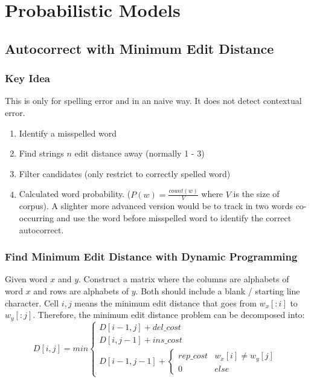 \chapter{Probabilistic Models}

\section{Autocorrect with Minimum Edit Distance}

\subsection{Key Idea} 
This is only for spelling error and in an naive way. It does not detect contextual error. 
\begin{enumerate}
    \item Identify a misspelled word 
    \item Find strings $n$ edit distance away (normally 1 - 3)
    \item Filter candidates (only restrict to correctly spelled word)
    \item Calculated word probability. ($P(w) = \frac{count(w)}{V}$ where $V$ is the size of corpus). A slighter more advanced version would be to track in two words co-occurring and use the word before misspelled word to identify the correct autocorrect. 
\end{enumerate}

\subsection{Find Minimum Edit Distance with Dynamic Programming} 
Given word $x$ and $y$. Construct a matrix where the columns are alphabets of word $x$ and rows are alphabets of $y$. Both should include a blank / starting line character. Cell $i,j$ means the minimum edit distance that goes from $w_x[:i]$ to $w_y[:j]$. Therefore, the minimum edit distance problem can be decomposed into: 
    \begin{equation*}
        D[i,j] = min
            \begin{cases}
                D[i-1,j] + del\_cost \\
                D[i,j-1] + ins\_cost \\
                D[i-1, j-1] +
                    \begin{cases}
                        rep\_cost & w_x[i] \neq w_y[j] \\
                        0 & else
                    \end{cases}
            \end{cases}
    \end{equation*}





